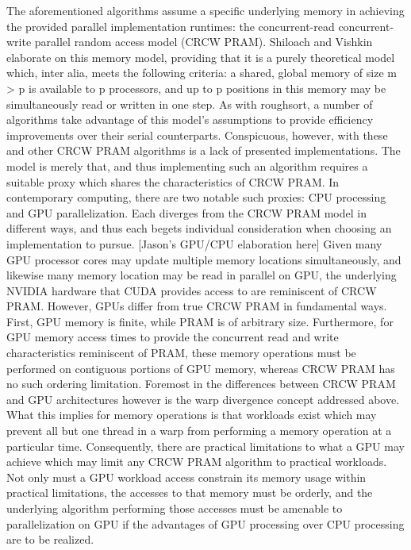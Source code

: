 	The aforementioned algorithms assume a specific underlying memory in achieving the provided parallel implementation runtimes: the concurrent-read concurrent-write parallel random access model (CRCW PRAM).  Shiloach and Vishkin elaborate on this memory model, providing that it is a purely theoretical model which, inter alia, meets the following criteria: a shared, global memory of size m > p is available to p processors, and up to p positions in this memory may be simultaneously read or written in one step\cite{Shiloach1981}.  As with roughsort, a number of algorithms take advantage of this model’s assumptions to provide efficiency improvements over their serial counterparts\cite{Shiloach1982}\cite{raj1989}. 
	Conspicuous, however, with these and other CRCW PRAM algorithms is a lack of presented implementations.  The model is merely that, and thus implementing such an algorithm requires a suitable proxy which shares the characteristics of CRCW PRAM.  In contemporary computing, there are two notable such proxies: CPU processing and GPU parallelization.  Each diverges from the CRCW PRAM model in different ways, and thus each begets individual consideration when choosing an implementation to pursue.
	[Jason’s GPU/CPU elaboration here]
Given many GPU processor cores may update multiple memory locations simultaneously, and likewise many memory location may be read in parallel on GPU, the underlying NVIDIA hardware that CUDA provides access to are reminiscent of CRCW PRAM.  However, GPUs differ from true CRCW PRAM in fundamental ways.  First, GPU memory is finite, while PRAM is of arbitrary size.  Furthermore, for GPU memory access times to provide the concurrent read and write characteristics reminiscent of PRAM, these memory operations must be performed on contiguous portions of GPU memory, whereas CRCW PRAM has no such ordering limitation.  Foremost in the differences between CRCW PRAM and GPU architectures however is the warp divergence concept addressed above.  What this implies for memory operations is that workloads exist which may prevent all but one thread in a warp from performing a memory operation at a particular time.  Consequently, there are practical limitations to what a GPU may achieve which may limit any CRCW PRAM algorithm to practical workloads.  Not only must a GPU workload access constrain its memory usage within practical limitations, the accesses to that memory must be orderly, and the underlying algorithm performing those accesses must be amenable to parallelization on GPU if the advantages of GPU processing over CPU processing are to be realized.\cite{dehne2010}
